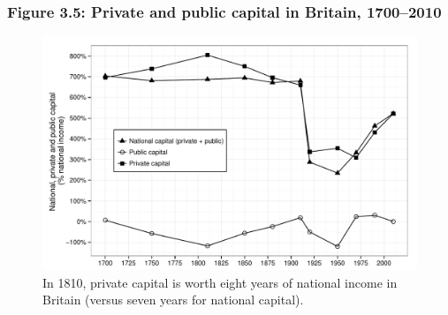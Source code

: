 \documentclass[t]{beamer}\usepackage[]{graphicx}\usepackage[]{color}
\newenvironment{knitrout}{}{} %
\begin{document}
\begin{frame}[label=Figure_3_5]
\frametitle{Figure 3.5: Private and public capital in Britain, 1700--2010}
\begin{figure}[t]
\begin{minipage}[b]{\textwidth}
\centering
\begin{knitrout}\footnotesize
{}\color{fgcolor}

{\centering \includegraphics[width=1\linewidth]{figures/bw/Figure_3_5} 

}



\end{knitrout}
\caption{In 1810, private capital is worth eight years of national income in Britain (versus seven years for national capital).}
\end{minipage}
\end{figure}
\end{frame}
\end{document}
